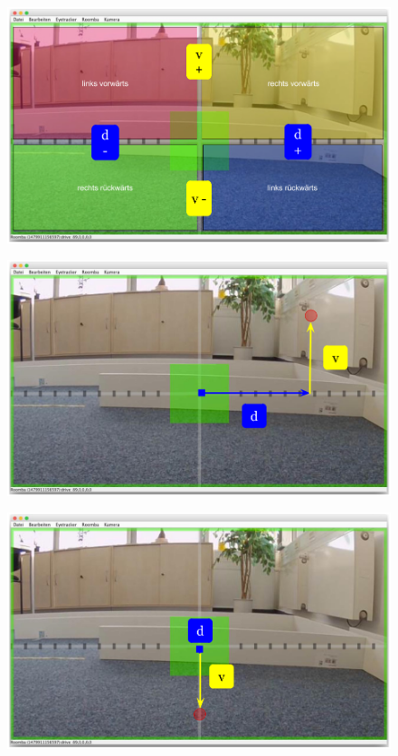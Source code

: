 \begin{figure}[ht]
   \begin{minipage}[b]{.5\linewidth} 
      \centering 
      \includegraphics[width=1\textwidth]{bilder/implementierung/richtungen.png} 
      \label{fig:1} 
   \end{minipage}%
   \hfill
   \begin{minipage}[b]{.5\linewidth} 
      \centering 
      \includegraphics[width=1\textwidth]{bilder/implementierung/rechtsDrive.png} 
      \label{fig:2} 
   \end{minipage}%
   \hfill
   \begin{minipage}[b]{.5\linewidth} 
      \centering 
      \includegraphics[width=1\textwidth]{bilder/implementierung/ruckDrive.png} 

\end{minipage}
\end{figure}
